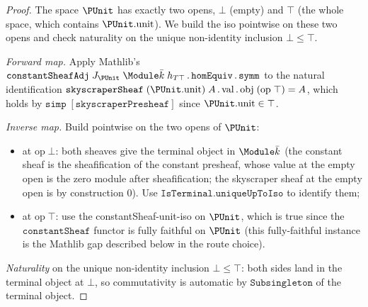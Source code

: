 \begin{proof}
  \leanok
  The space \(\PUnit\) has exactly two opens, \(\bot\) (empty) and
  \(\top\) (the whole space, which contains \(\PUnit.\mathrm{unit}\)).
  We build the iso pointwise on these two opens and check naturality
  on the unique non-identity inclusion \(\bot \le \top\).

  \emph{Forward map.} Apply Mathlib's
  \(\mathtt{constantSheafAdj}\;J_{\PUnit}\;\Module \bar k\;
   h_{T\top}\,.\,\mathtt{homEquiv}\,.\,\mathtt{symm}\) to the natural
  identification
  \(\mathtt{skyscraperSheaf}\;(\PUnit.\mathrm{unit})\;A\,.\,\mathrm{val}\,.
    \,\mathrm{obj}\;(\mathrm{op}\;\top) = A\),
  which holds by \(\mathtt{simp}\;[\mathtt{skyscraperPresheaf}]\) since
  \(\PUnit.\mathrm{unit} \in \top\).

  \emph{Inverse map.} Build pointwise on the two opens of \(\PUnit\):
  \begin{itemize}
    \item at \(\mathrm{op}\;\bot\): both sheaves give the terminal
      object in \(\Module \bar k\) (the constant sheaf is the
      sheafification of the constant presheaf, whose value at the
      empty open is the zero module after sheafification; the
      skyscraper sheaf at the empty open is by construction
      \(0\)). Use \(\mathtt{IsTerminal.uniqueUpToIso}\) to identify
      them;
    \item at \(\mathrm{op}\;\top\): use the constantSheaf-unit-iso on
      \(\PUnit\), which is true since the \(\mathtt{constantSheaf}\)
      functor is fully faithful on \(\PUnit\) (this fully-faithful
      instance is the Mathlib gap described below in the route
      choice).
  \end{itemize}

  \emph{Naturality} on the unique non-identity inclusion
  \(\bot \le \top\): both sides land in the terminal object at
  \(\bot\), so commutativity is automatic by \(\mathtt{Subsingleton}\)
  of the terminal object.


\end{proof}
